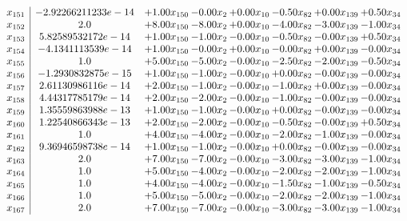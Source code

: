 \documentclass[8pt]{article}
\begin{document}
\[\begin{array}{c| c c@{\hskip 2pt} c@{\hskip 2pt} c@{\hskip 2pt} c@{\hskip 2pt} c@{\hskip 2pt} c@{\hskip 2pt} }
 x_{151}   &  -2.92266211233e-14 & +  1.00 x_{150} & -0.00 x_{2} & +  0.00 x_{10} & -0.50 x_{82} & +  0.00 x_{139} & +  0.50 x_{34}\\
 x_{152}   &  2.0 & +  8.00 x_{150} & -8.00 x_{2} & +  0.00 x_{10} & -4.00 x_{82} & -3.00 x_{139} & -1.00 x_{34}\\
 x_{153}   &  5.82589532172e-14 & +  1.00 x_{150} & -1.00 x_{2} & -0.00 x_{10} & -0.50 x_{82} & -0.00 x_{139} & +  0.50 x_{34}\\
 x_{154}   &  -4.1341113539e-14 & +  1.00 x_{150} & -0.00 x_{2} & +  0.00 x_{10} & -0.00 x_{82} & +  0.00 x_{139} & -0.00 x_{34}\\
 x_{155}   &  1.0 & +  5.00 x_{150} & -5.00 x_{2} & -0.00 x_{10} & -2.50 x_{82} & -2.00 x_{139} & -0.50 x_{34}\\
 x_{156}   &  -1.2930832875e-15 & +  1.00 x_{150} & -1.00 x_{2} & -0.00 x_{10} & +  0.00 x_{82} & -0.00 x_{139} & -0.00 x_{34}\\
 x_{157}   &  2.61130986116e-14 & +  2.00 x_{150} & -1.00 x_{2} & -0.00 x_{10} & -1.00 x_{82} & +  0.00 x_{139} & -0.00 x_{34}\\
 x_{158}   &  4.44317785179e-14 & +  2.00 x_{150} & -2.00 x_{2} & -0.00 x_{10} & -1.00 x_{82} & -0.00 x_{139} & -0.00 x_{34}\\
 x_{159}   &  1.35559863988e-13 & +  1.00 x_{150} & -1.00 x_{2} & -0.00 x_{10} & +  0.00 x_{82} & -0.00 x_{139} & -0.00 x_{34}\\
 x_{160}   &  1.22540866343e-13 & +  2.00 x_{150} & -2.00 x_{2} & -0.00 x_{10} & -0.50 x_{82} & -0.00 x_{139} & +  0.50 x_{34}\\
 x_{161}   &  1.0 & +  4.00 x_{150} & -4.00 x_{2} & -0.00 x_{10} & -2.00 x_{82} & -1.00 x_{139} & -0.00 x_{34}\\
 x_{162}   &  9.36946598738e-14 & +  1.00 x_{150} & -1.00 x_{2} & -0.00 x_{10} & +  0.00 x_{82} & -0.00 x_{139} & -0.00 x_{34}\\
 x_{163}   &  2.0 & +  7.00 x_{150} & -7.00 x_{2} & -0.00 x_{10} & -3.00 x_{82} & -3.00 x_{139} & -1.00 x_{34}\\
 x_{164}   &  1.0 & +  5.00 x_{150} & -4.00 x_{2} & -0.00 x_{10} & -2.00 x_{82} & -2.00 x_{139} & -1.00 x_{34}\\
 x_{165}   &  1.0 & +  4.00 x_{150} & -4.00 x_{2} & -0.00 x_{10} & -1.50 x_{82} & -1.00 x_{139} & -0.50 x_{34}\\
 x_{166}   &  1.0 & +  5.00 x_{150} & -5.00 x_{2} & -0.00 x_{10} & -2.00 x_{82} & -2.00 x_{139} & -1.00 x_{34}\\
 x_{167}   &  2.0 & +  7.00 x_{150} & -7.00 x_{2} & -0.00 x_{10} & -3.00 x_{82} & -3.00 x_{139} & -1.00 x_{34}\\

\end{array}\]
\end{document}
